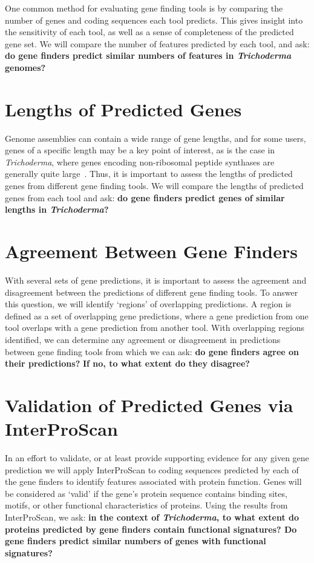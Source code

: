 One common method for evaluating gene finding tools is by comparing the number of genes and coding sequences each tool predicts. This gives insight into the sensitivity of each tool, as well as a sense of completeness of the predicted gene set. We will compare the number of features predicted by each tool, and ask: \textbf{do gene finders predict similar numbers of features in \textit{Trichoderma} genomes?}

\section{Lengths of Predicted Genes}
\label{rq:gene-lengths}
Genome assemblies can contain a wide range of gene lengths, and for some
users, genes of a specific length may be a key point of interest, as is the case in \textit{Trichoderma}, where genes encoding non-ribosomal peptide synthases are generally quite large~\cite{komaki2020}. Thus, it is important to assess the lengths of predicted genes from different gene finding tools. We will compare the lengths of predicted genes from each tool and ask: \textbf{do gene finders predict genes of similar lengths in \textit{Trichoderma}?}

\section{Agreement Between Gene Finders} 
\label{identify-regions}
With several sets of gene predictions, it is important to assess the agreement and disagreement between the predictions of different gene finding tools. To answer this question, we will identify `regions' of overlapping predictions. A 
region is defined as a set of overlapping gene predictions, where a gene prediction from one tool overlaps with a gene prediction from another tool.
With overlapping regions identified, we can determine any agreement or disagreement in predictions between gene finding tools
from which we can ask: \textbf{do gene finders agree on their
  predictions?} \textbf{If no, to what extent do they disagree?}

\section{Validation of Predicted Genes via InterProScan}
\label{rq:interproscan}
In an effort to validate, or at least provide supporting evidence for
any given gene prediction we will apply InterProScan to coding
sequences predicted by each of the gene finders to identify features
associated with protein function. Genes will be considered as `valid'
if the gene's protein sequence contains binding sites, motifs, or
other functional characteristics of proteins. Using the results from
InterProScan, we ask: \textbf{in the context of
  \textit{Trichoderma}, to what extent do proteins predicted by gene finders contain
  functional signatures? Do gene finders predict similar numbers of genes with functional signatures?}

